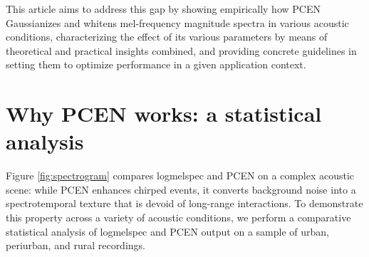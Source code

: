 \documentclass[journal]{IEEEtran}
\theoremstyle{remark}
\begin{document}
This article aims to address this gap by showing empirically how PCEN Gaussianizes and whitens mel-frequency magnitude spectra in various acoustic conditions, characterizing the effect of its various parameters by means of theoretical and practical insights combined, and providing concrete guidelines in setting them to optimize performance in a given application context.


\section{Why PCEN works: a statistical analysis\label{sec:statistical}}
Figure \ref{fig:spectrogram} compares logmelspec and PCEN on a complex acoustic scene: while PCEN enhances chirped events, it converts background noise into a spectrotemporal texture that is devoid of long-range interactions.
To demonstrate this property across a variety of acoustic conditions, we perform a comparative statistical analysis of logmelspec and PCEN output on a sample of urban, periurban, and rural recordings.
\end{document}

